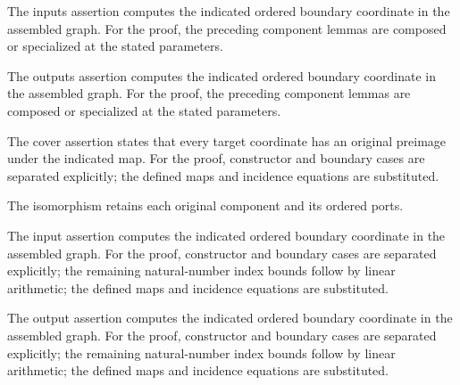 The inputs assertion computes the indicated ordered boundary coordinate in the assembled graph.
For the proof, the preceding component lemmas are composed or specialized at the stated parameters.
\par{}

The outputs assertion computes the indicated ordered boundary coordinate in the assembled graph.
For the proof, the preceding component lemmas are composed or specialized at the stated parameters.
\par{}

The cover assertion states that every target coordinate has an original preimage under the indicated map.
For the proof, constructor and boundary cases are separated explicitly; the defined maps and incidence equations are substituted.
\par{}

The isomorphism retains each original component and its ordered ports.
\par{}

The input assertion computes the indicated ordered boundary coordinate in the assembled graph.
For the proof, constructor and boundary cases are separated explicitly; the remaining natural-number index bounds follow by linear arithmetic; the defined maps and incidence equations are substituted.
\par{}

The output assertion computes the indicated ordered boundary coordinate in the assembled graph.
For the proof, constructor and boundary cases are separated explicitly; the remaining natural-number index bounds follow by linear arithmetic; the defined maps and incidence equations are substituted.
\par{}

